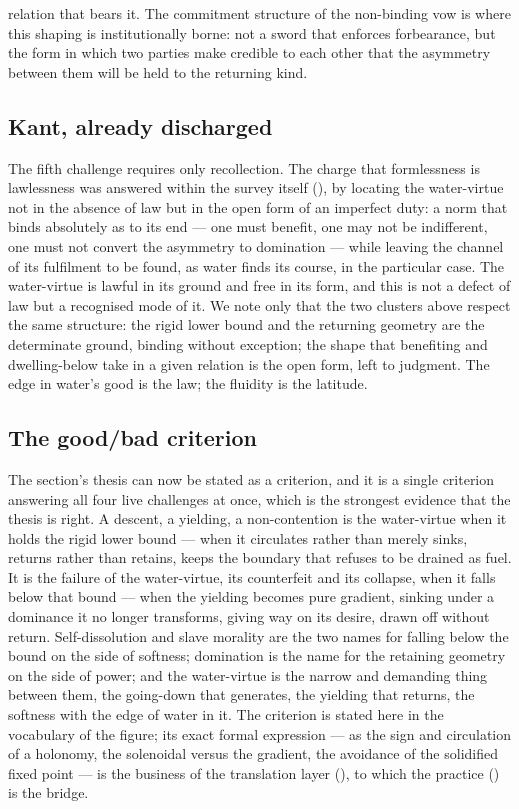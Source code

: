 relation that bears it. The commitment structure of the non-binding vow \parencite{paperxiii} is where this shaping is institutionally borne: not a sword that enforces forbearance, but the form in which two parties make credible to each other that the asymmetry between them will be held to the returning kind.

\subsection{Kant, already discharged}
\label{p20:sub:dialectic-kant}

The fifth challenge requires only recollection. The charge that formlessness is lawlessness was answered within the survey itself (), by locating the water-virtue not in the absence of law but in the open form of an imperfect duty: a norm that binds absolutely as to its end --- one must benefit, one may not be indifferent, one must not convert the asymmetry to domination --- while leaving the channel of its fulfilment to be found, as water finds its course, in the particular case. The water-virtue is lawful in its ground and free in its form, and this is not a defect of law but a recognised mode of it. We note only that the two clusters above respect the same structure: the rigid lower bound and the returning geometry are the determinate ground, binding without exception; the shape that benefiting and dwelling-below take in a given relation is the open form, left to judgment. The edge in water's good is the law; the fluidity is the latitude.

\subsection{The good/bad criterion}
\label{p20:sub:dialectic-criterion}

The section's thesis can now be stated as a criterion, and it is a single criterion answering all four live challenges at once, which is the strongest evidence that the thesis is right. A descent, a yielding, a non-contention is the water-virtue when it holds the rigid lower bound --- when it circulates rather than merely sinks, returns rather than retains, keeps the boundary that refuses to be drained as fuel. It is the failure of the water-virtue, its counterfeit and its collapse, when it falls below that bound --- when the yielding becomes pure gradient, sinking under a dominance it no longer transforms, giving way on its desire, drawn off without return. Self-dissolution and slave morality are the two names for falling below the bound on the side of softness; domination is the name for the retaining geometry on the side of power; and the water-virtue is the narrow and demanding thing between them, the going-down that generates, the yielding that returns, the softness with the edge of water in it. The criterion is stated here in the vocabulary of the figure; its exact formal expression --- as the sign and circulation of a holonomy, the solenoidal versus the gradient, the avoidance of the solidified fixed point --- is the business of the translation layer (), to which the practice () is the bridge.
